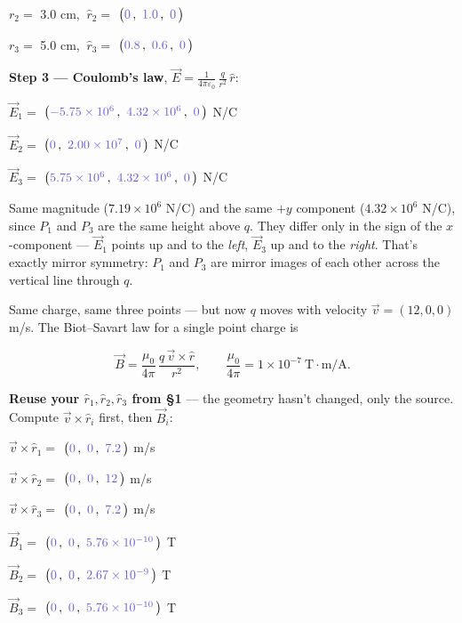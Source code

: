 \documentclass[12pt]{article}
\newcommand{\ANS}[1]{\textcolor{accent}{#1}}
\newcommand{\disc}[1]{{\small\color{accent} #1}}
\newcommand{\vecans}[3]{$\big(\textcolor{accent}{#1}\,,\ \textcolor{accent}{#2}\,,\ \textcolor{accent}{#3}\,\big)$}
\begin{document}
$r_2 = $ \ANS{3.0} cm, $\ \hat r_2 = $ \vecans{0}{1.0}{0}

$r_3 = $ \ANS{5.0} cm, $\ \hat r_3 = $ \vecans{0.8}{0.6}{0}

\textbf{Step 3 --- Coulomb's law}, $\displaystyle \vec E = \frac{1}{4\pi
\varepsilon_0}\,\frac{q}{r^2}\,\hat r$:

$\vec E_1 = $ \vecans{-5.75\times10^6}{4.32\times10^6}{0} N/C

$\vec E_2 = $ \vecans{0}{2.00\times10^7}{0} N/C

$\vec E_3 = $ \vecans{5.75\times10^6}{4.32\times10^6}{0} N/C


\disc{Same magnitude ($7.19\times10^6$ N/C) and the same $+y$ component
($4.32\times10^6$ N/C), since $P_1$ and $P_3$ are the same height above $q$.
They differ only in the sign of the $x$-component --- $\vec E_1$ points up
and to the \emph{left}, $\vec E_3$ up and to the \emph{right}. That's exactly
mirror symmetry: $P_1$ and $P_3$ are mirror images of each other across the
vertical line through $q$.}


Same charge, same three points --- but now $q$ moves with velocity
$\vec v = (12,0,0)$ m/s. The Biot--Savart law for a single point charge is

\[
\vec B = \frac{\mu_0}{4\pi}\,\frac{q\,\vec v\times\hat r}{r^2}, \qquad
\frac{\mu_0}{4\pi} = 1\times10^{-7}\ \text{T}\!\cdot\!\text{m/A}.
\]

\textbf{Reuse your $\hat r_1,\hat r_2,\hat r_3$ from \S1} --- the geometry
hasn't changed, only the source. Compute $\vec v\times\hat r_i$ first, then
$\vec B_i$:

$\vec v\times\hat r_1 = $ \vecans{0}{0}{7.2} m/s

$\vec v\times\hat r_2 = $ \vecans{0}{0}{12} m/s

$\vec v\times\hat r_3 = $ \vecans{0}{0}{7.2} m/s

$\vec B_1 = $ \vecans{0}{0}{5.76\times10^{-10}} T

$\vec B_2 = $ \vecans{0}{0}{2.67\times10^{-9}} T

$\vec B_3 = $ \vecans{0}{0}{5.76\times10^{-10}} T

\end{document}
